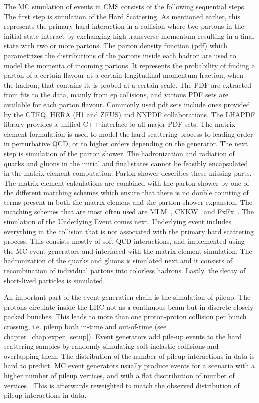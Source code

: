 The MC simulation of events in CMS consists of the following sequential steps. The first step is simulation of the Hard Scattering. As mentioned earlier, this represents the primary hard interaction in a collision where two partons in the initial state interact by exchanging high transverse momentum resulting in a final state with two or more partons. The parton density function (pdf) which parametrizes the distributions of the partons inside each hadron are used to model the momenta of incoming partons. It represents the probability of finding a parton of a certain flavour at a certain longitudinal momentum fraction, when the hadron, that contains it, is probed at a certain scale. The PDF are extracted from fits to the data, mainly from ep collisions, and various PDF sets are available for each parton flavour. Commonly used pdf sets include ones provided by the  CTEQ, HERA (H1 and ZEUS) and NNPDF collaborations. The LHAPDF library provides a unified C++ interface to all major PDF sets. The matrix element formulation is used to model the hard scattering process to leading order in perturbative QCD, or to higher orders depending on the generator. The next step is simulation of the parton shower. The hadronization and radiation of quarks and gluons in the initial and final states cannot be feasibly encapsulated in the matrix element computation. Parton shower describes these missing parts. The matrix element calculations are combined with the parton shower by one of the different matching schemes which ensure that there is no double counting of terms present in both the matrix element and the partion shower expansion. The matching schemes that are most often used are MLM~\cite{mlm}, CKKW~\cite{ckkw} and FxFx~\cite{Frederix:2012ps}. The simulation of the Underlying Event comes next. Underlying event includes everything in the collision that is not associated with the primary hard scattering process. This consists mostly of soft QCD interactions, and implemented using the MC event generators and interfaced with the matrix element simulation. The hadronization of the quarks and gluons is simulated next and it consists of recombination of individual partons into colorless hadrons. Lastly, the decay of short-lived particles is simulated.

An important part of the event generation chain is the simulation of pileup. The protons circulate inside the LHC not as a continuous beam but in discrete closely packed bunches. This leads to more than one proton-proton collision per bunch crossing, i.e. pileup both in-time and out-of-time (see chapter~\ref{chap:exper_setup}). Event generators add  pile-up events to the hard scattering samples by randomly simulating soft inelastic collisions and overlapping them. The distribution of the number of pileup interactions in data is hard to predict. MC event generators usually produce events for a scenario with a higher number of pileup vertices, and with a flat disctribution of number of vertices . This is afterwards reweighted to match the observed distribution of pileup interactions in data.

